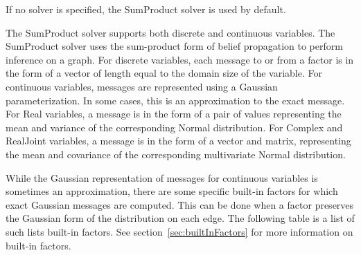 If no solver is specified, the SumProduct solver is used by default.

The SumProduct solver supports both discrete and continuous variables.  The SumProduct solver uses the sum-product form of belief propagation to perform inference on a graph.  For discrete variables, each message to or from a factor is in the form of a vector of length equal to the domain size of the variable.  For continuous variables, messages are represented using a Gaussian parameterization.  In some cases, this is an approximation to the exact message.  For Real variables, a message is in the form of a pair of values representing the mean and variance of the corresponding Normal distribution.  For Complex and RealJoint variables, a message is in the form of a vector and matrix, representing the mean and covariance of the corresponding multivariate Normal distribution.

While the Gaussian representation of messages for continuous variables is sometimes an approximation, there are some specific built-in factors for which exact Gaussian messages are computed.  This can be done when a factor preserves the Gaussian form of the distribution on each edge.  The following table is a list of such lists built-in factors.  See section~\ref{sec:builtInFactors} for more information on built-in factors.


